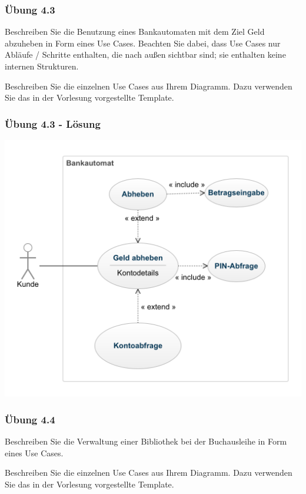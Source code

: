 \begin{frame}
\frametitle{Übung 4.3}
	Beschreiben Sie die Benutzung eines Bankautomaten mit dem Ziel Geld abzuheben in Form
	eines Use Cases. Beachten Sie dabei, dass Use Cases nur Abläufe / Schritte enthalten,
	die nach außen sichtbar sind; sie enthalten keine internen Strukturen.

	Beschreiben Sie die einzelnen Use Cases aus Ihrem Diagramm. Dazu verwenden Sie das in der Vorlesung vorgestellte
	Template.
\end{frame}

\ifloesung
\begin{frame}
\frametitle{Übung 4.3 - Lösung}
	\includegraphics[width=1\textwidth,
	keepaspectratio=true]{bilder/use_case_aufg3_lsg.png}
\end{frame}
\fi

\begin{frame}
\frametitle{Übung 4.4}
	Beschreiben Sie die Verwaltung einer Bibliothek bei der Buchausleihe in Form
	eines Use Cases.

	Beschreiben Sie die einzelnen Use Cases aus Ihrem Diagramm. Dazu verwenden Sie das in der Vorlesung vorgestellte
	Template.
\end{frame}

